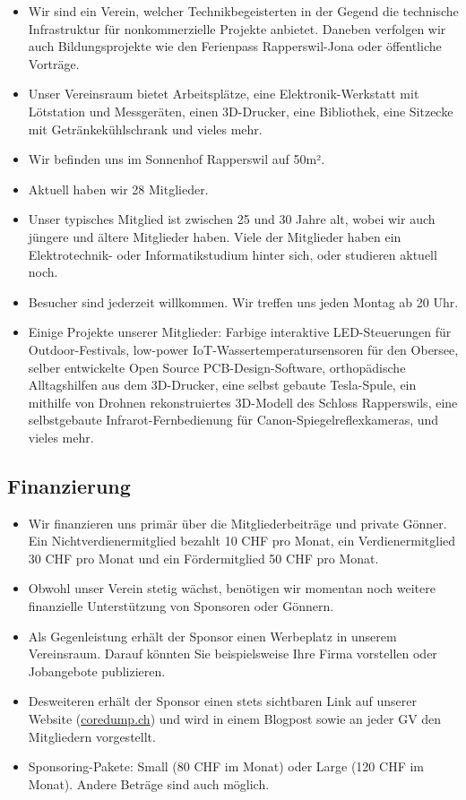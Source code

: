 \documentclass[10pt,a4paper,parskip,fleqn]{scrartcl}
\begin{document}
\begin{itemize}
	\item Wir sind ein Verein, welcher Technikbegeisterten in der Gegend die
		technische Infrastruktur für nonkommerzielle Projekte anbietet. Daneben
		verfolgen wir auch Bildungsprojekte wie den Ferienpass Rapperswil-Jona oder
		öffentliche Vorträge.
	\item Unser Vereinsraum bietet Arbeitsplätze, eine Elektronik-Werkstatt mit
		Lötstation und Messgeräten, einen 3D-Drucker, eine Bibliothek, eine Sitzecke
		mit Getränkekühlschrank und vieles mehr.
	\item Wir befinden uns im Sonnenhof Rapperswil auf 50m².
	\item Aktuell haben wir 28 Mitglieder.
	\item Unser typisches Mitglied ist zwischen 25 und 30 Jahre alt, wobei wir
		auch jüngere und ältere Mitglieder haben. Viele der Mitglieder haben ein
		Elektrotechnik- oder Informatikstudium hinter sich, oder studieren aktuell
		noch.
	\item Besucher sind jederzeit willkommen. Wir treffen uns jeden Montag ab 20
		Uhr.
	\item Einige Projekte unserer Mitglieder: Farbige interaktive LED-Steuerungen
		für Outdoor-Festivals, low-power IoT-Wassertemperatursensoren für den
		Obersee, selber entwickelte Open Source PCB-Design-Software, orthopädische
		Alltagshilfen aus dem 3D-Drucker, eine selbst gebaute Tesla-Spule, ein
		mithilfe von Drohnen rekonstruiertes 3D-Modell des Schloss Rapperswils, eine
		selbstgebaute Infrarot-Fernbedienung für Canon-Spiegelreflexkameras, und
		vieles mehr.
\end{itemize}

\subsection{Finanzierung}

\begin{itemize}
	\item Wir finanzieren uns primär über die Mitgliederbeiträge und private
		Gönner. Ein Nichtverdienermitglied bezahlt 10 CHF pro Monat, ein
		Verdienermitglied 30 CHF pro Monat und ein Fördermitglied 50 CHF pro Monat.
	\item Obwohl unser Verein stetig wächst, benötigen wir momentan noch weitere
		finanzielle Unterstützung von Sponsoren oder Gönnern.
	\item Als Gegenleistung erhält der Sponsor einen Werbeplatz in unserem
		Vereinsraum. Darauf könnten Sie beispielsweise Ihre Firma vorstellen oder
		Jobangebote publizieren.
	\item Desweiteren erhält der Sponsor einen stets sichtbaren Link auf unserer
		Website (\url{coredump.ch}) und wird in einem Blogpost sowie an jeder GV den
		Mitgliedern vorgestellt.
	\item Sponsoring-Pakete: Small (80 CHF im Monat) oder Large (120 CHF im
		Monat). Andere Beträge sind auch möglich.
\end{itemize}
\end{document}
